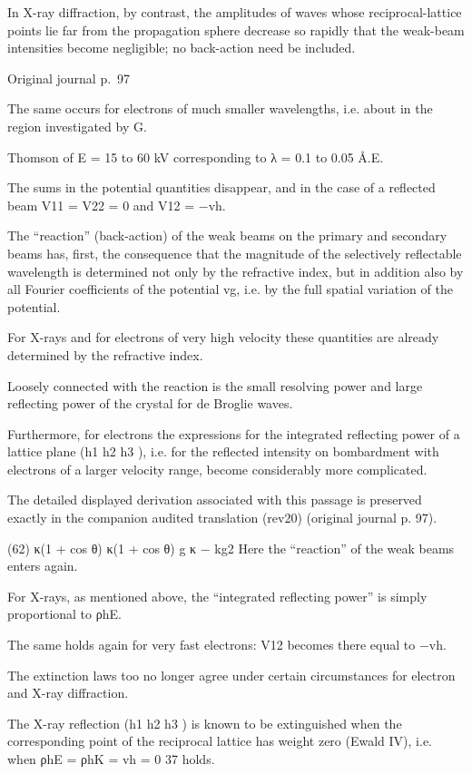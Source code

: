 \documentclass[10pt]{article}
\newcommand{\origpage}[1]{\par\medskip\noindent\hfill{\small\color{notegray}Original journal p.~#1}\hfill\mbox{}\par\smallskip}
\begin{document}
In X-ray diffraction, by contrast, the amplitudes of waves whose reciprocal-lattice points lie far from the propagation sphere decrease so rapidly that the weak-beam intensities become negligible; no back-action need be included.\par
\origpage{97}
The same occurs for electrons of much smaller wavelengths, i.e. about in the region investigated by G.\par
Thomson of E = 15 to 60 kV corresponding to λ = 0.1 to 0.05 Å.E.\par
The sums in the potential quantities disappear, and in the case of a reflected beam V11 = V22 = 0 and V12 = −vh.\par
The “reaction” (back-action) of the weak beams on the primary and secondary beams has, first, the consequence that the magnitude of the selectively reflectable wavelength is determined not only by the refractive index, but in addition also by all Fourier coefficients of the potential vg, i.e. by the full spatial variation of the potential.\par
For X-rays and for electrons of very high velocity these quantities are already determined by the refractive index.\par
Loosely connected with the reaction is the small resolving power and large reflecting power of the crystal for de Broglie waves.\par
Furthermore, for electrons the expressions for the integrated reflecting power of a lattice plane (h1 h2 h3 ), i.e. for the reflected intensity on bombardment with electrons of a larger velocity range, become considerably more complicated.\par
The detailed displayed derivation associated with this passage is preserved exactly in the companion audited translation (rev20) (original journal p. 97).\par
(62) κ(1 + cos θ) κ(1 + cos θ) g κ − kg2 Here the “reaction” of the weak beams enters again.\par
For X-rays, as mentioned above, the “integrated reflecting power” is simply proportional to ρhE.\par
The same holds again for very fast electrons: V12 becomes there equal to −vh.\par
The extinction laws too no longer agree under certain circumstances for electron and X-ray diffraction.\par
The X-ray reflection (h1 h2 h3 ) is known to be extinguished when the corresponding point of the reciprocal lattice has weight zero (Ewald IV), i.e. when ρhE = ρhK = vh = 0 37 holds.\par
\end{document}
